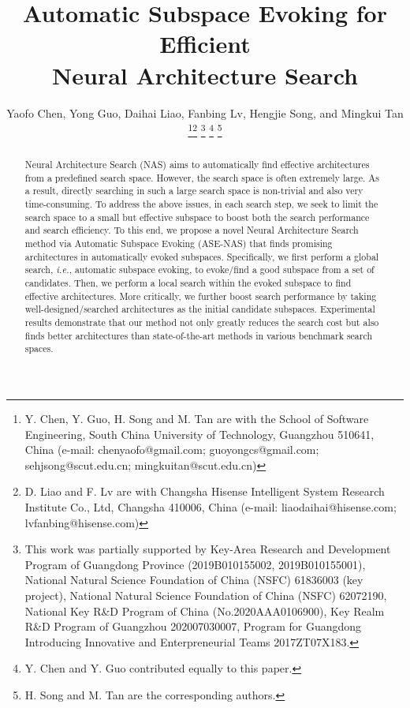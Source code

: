 \documentclass[lettersize,journal]{IEEEtran}
\newcommand{\sexyname}{ASE-NAS\xspace}
\def\ie{\emph{i.e.}} \def\Ie{\emph{I.e.}}
\begin{document}
\title{Automatic Subspace Evoking for Efficient \\ Neural Architecture Search}

\author{
Yaofo Chen, Yong Guo, Daihai Liao, Fanbing Lv,  Hengjie Song, and Mingkui Tan
\thanks{
	Y. Chen, Y. Guo, H. Song and M. Tan
	are with the School of Software Engineering,
	South China University of Technology,
	Guangzhou 510641,
	China
	(e-mail:
	chenyaofo@gmail.com;
	guoyongcs@gmail.com;
	sehjsong@scut.edu.cn;
	mingkuitan@scut.edu.cn)
}\thanks{
	D. Liao and F. Lv are with Changsha Hisense Intelligent System Research Institute Co., Ltd, Changsha 410006, China
	(e-mail:
	liaodaihai@hisense.com;
	lvfanbing@hisense.com)
}
\thanks{
This work was partially supported by Key-Area Research and Development Program of Guangdong  Province (2019B010155002, 2019B010155001), National Natural Science Foundation of China (NSFC) 61836003 (key project), National Natural Science Foundation of China (NSFC) 62072190, National Key R\&D Program of China (No.2020AAA0106900), Key Realm R\&D Program of Guangzhou 202007030007, Program for Guangdong Introducing Innovative and Enterpreneurial Teams 2017ZT07X183.
}
\thanks{Y. Chen and Y. Guo contributed equally to this paper.}
\thanks{H. Song and M. Tan are the corresponding authors.}
}



\maketitle

\begin{abstract}
Neural Architecture Search (NAS) aims to automatically find effective architectures from a predefined search space.
However, the search space is often extremely large.
As a result, directly searching in such a large search space is non-trivial and also very time-consuming.
To address the above issues, in each search step, we seek to limit the search space to a small but effective subspace to boost both the search performance and search efficiency.
To this end, we propose a novel Neural Architecture Search method via Automatic Subspace Evoking (\sexyname) that finds promising architectures in automatically evoked subspaces.
Specifically, we first perform a global search, \ie, automatic subspace evoking, to evoke/find a good subspace from a set of candidates.
Then, we perform a local search within the evoked subspace to find effective architectures.
More critically, we further boost search performance by taking well-designed/searched architectures as the initial candidate subspaces.
Experimental results demonstrate that our method not only greatly reduces the search cost but also finds better architectures than state-of-the-art methods in various benchmark search spaces.
\end{abstract}
\end{document}
